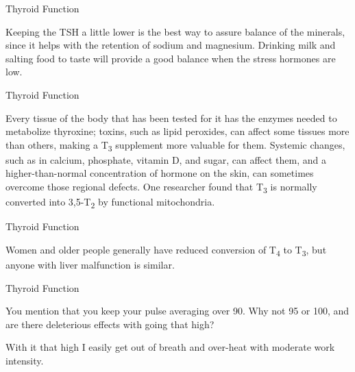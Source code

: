 \documentclass[11pt,oneside,openany,extrafontsizes]{memoir}
\begin{document}
\begin{standalonequote}{Thyroid Function}

    \begin{answer}
      Keeping the TSH a little lower is the best way to assure balance of the minerals, since it helps with the retention of sodium and magnesium. Drinking milk and salting food to taste will provide a good balance when the stress hormones are low.
    \end{answer}
\end{standalonequote}

\begin{standalonequote}{Thyroid Function}

    \begin{answer}
       Every tissue of the body that has been tested for it has the enzymes needed to metabolize thyroxine; toxins, such as lipid peroxides, can affect some tissues more than others, making a T\textsubscript{3} supplement more valuable for them. Systemic changes, such as in calcium, phosphate, vitamin D, and sugar, can affect them, and a higher-than-normal concentration of hormone on the skin, can sometimes overcome those regional defects. One researcher found that T\textsubscript{3} is normally converted into 3,5-T\textsubscript{2} by functional mitochondria. 
    \end{answer}
\end{standalonequote}

\begin{standalonequote}{Thyroid Function}

    \begin{answer}
      Women and older people generally have reduced conversion of T\textsubscript{4} to T\textsubscript{3}, but anyone with liver malfunction is similar.
    \end{answer}
\end{standalonequote}

\begin{qaexchange}{Thyroid Function}

    \begin{question}
        You mention that you keep your pulse averaging over 90. Why not 95 or 100, and are there deleterious effects with going that high?
    \end{question}

    \begin{answer}
      With it that high I easily get out of breath and over-heat with moderate work intensity.
    \end{answer}
\end{qaexchange}
\end{document}
